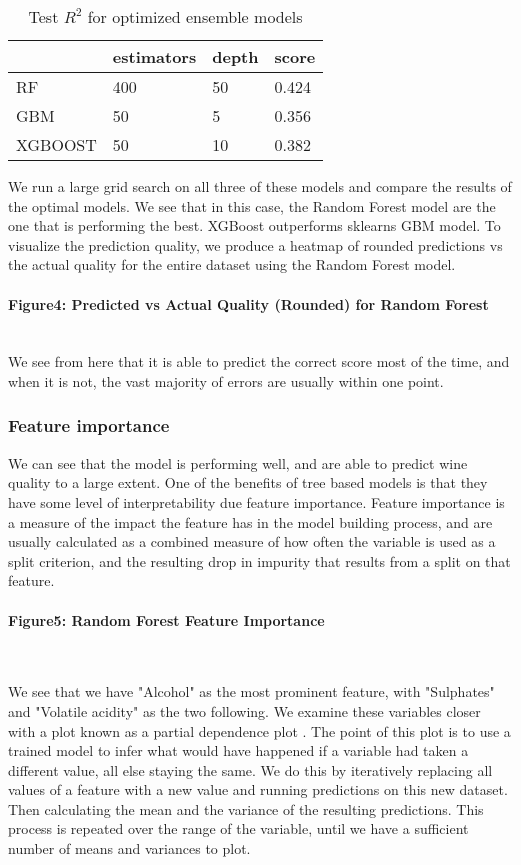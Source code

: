 \documentclass[10pt, a4paper, twocolumn]{article}
\newcommand{\myparagraph}[1]{\paragraph{#1}\mbox{}\\}
\begin{document}
			\begin{table}[H]
				\caption{Test $R^2$ for optimized ensemble models}
				\begin{tabular}{@{}llll@{}}
					\toprule
					& estimators & depth & score               \\ \midrule
					RF      & 400        & 50    & 0.424 \\
					GBM     & 50         & 5     & 0.356 \\
					XGBOOST & 50         & 10    & 0.382  \\ \bottomrule
				\end{tabular}
			\end{table}
			
			We run a large grid search on all three of these models and compare the results of the optimal models. We see that in this case, the Random Forest model are the one that is performing the best. XGBoost outperforms sklearns GBM model. To visualize the prediction quality, we produce a heatmap of rounded predictions vs the actual quality for the entire dataset using the Random Forest model.
			
			\myparagraph{Figure4: Predicted vs Actual Quality (Rounded) for Random Forest}
			We see from here that it is able to predict the correct score most of the time, and when it is not, the vast majority of errors are usually within one point.
			
		\subsubsection{Feature importance}
			We can see that the model is performing well, and are able to predict wine quality to a large extent. One of the benefits of tree based models is that they have some level of interpretability due feature importance. Feature importance is a measure of the impact the feature has in the model building process, and are usually calculated as a combined measure of how often the variable is used as a split criterion, and the resulting drop in impurity that results from a split on that feature.\cite{stackOFfeatimp}
						
			\myparagraph{Figure5: Random Forest Feature Importance }
			
			We see that we have "Alcohol" as the most prominent feature, with "Sulphates" and "Volatile acidity" as the two following. We examine these variables closer with a plot known as a partial dependence plot \cite{chris}. The point of this plot is to use a trained model to infer what would have happened if a variable had taken a different value, all else staying the same. We do this by iteratively replacing all values of a feature with a new value and running predictions on this new dataset. Then calculating the mean and the variance of the resulting predictions. This process is repeated over the range of the variable, until we have a sufficient number of means and variances to plot.
			
\end{document}
